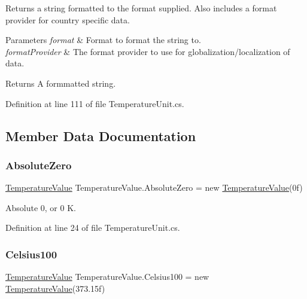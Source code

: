 Returns a string formatted to the format supplied. Also includes a format provider for country specific data. 


\begin{DoxyParams}{Parameters}
{\em format} & Format to format the string to. \\
\hline
{\em format\+Provider} & The format provider to use for globalization/localization of data. \\
\hline
\end{DoxyParams}
\begin{DoxyReturn}{Returns}
A formmatted string. 
\end{DoxyReturn}


Definition at line 111 of file Temperature\+Unit.\+cs.



\subsection{Member Data Documentation}
\mbox{\label{struct_temperature_value_a4281a7b4ca1196b7282db630909c810c}} 
\subsubsection{\texorpdfstring{Absolute\+Zero}{AbsoluteZero}}
{\footnotesize\ttfamily \hyperlink{struct_temperature_value}{Temperature\+Value} Temperature\+Value.\+Absolute\+Zero = new \hyperlink{struct_temperature_value}{Temperature\+Value}(0f)\hspace{0.3cm}{\ttfamily [static]}}



Absolute 0, or 0 K. 



Definition at line 24 of file Temperature\+Unit.\+cs.

\mbox{\label{struct_temperature_value_a11cdb28b1792fe73588f3fd75b790c98}} 
\subsubsection{\texorpdfstring{Celsius100}{Celsius100}}
{\footnotesize\ttfamily \hyperlink{struct_temperature_value}{Temperature\+Value} Temperature\+Value.\+Celsius100 = new \hyperlink{struct_temperature_value}{Temperature\+Value}(373.\+15f)\hspace{0.3cm}{\ttfamily [static]}}



